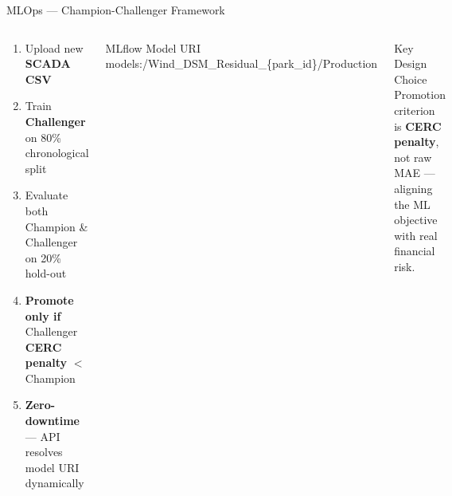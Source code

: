 \documentclass[aspectratio=169,10pt]{beamer}
\newcommand{\emphblue}[1]{{\color{WindBlue}\textbf{#1}}}
\newcommand{\emphgreen}[1]{{\color{MLgreen}\textbf{#1}}}
\newcommand{\emphred}[1]{{\color{DSMred}\textbf{#1}}}
\begin{document}
\begin{frame}{MLOps — Champion-Challenger Framework}
  \begin{columns}[T]
      \begin{tcolorbox}[orangebox, title={\faExchangeAlt\; Promotion Logic}]
        \begin{enumerate}[leftmargin=1.2em, itemsep=5pt, font=\small]
          \item Upload new \emphblue{SCADA CSV}
          \item Train \emphgreen{Challenger} on 80\% chronological split
          \item Evaluate both Champion \& Challenger on 20\% hold-out
          \item \textbf{Promote only if} Challenger \emphred{CERC penalty} $<$ Champion
          \item \emphgreen{Zero-downtime} — API resolves model URI dynamically
        \end{enumerate}
      \end{tcolorbox}

      \vspace{6pt}
      \begin{block}{MLflow Model URI}
        \small\ttfamily models:/Wind\_DSM\_Residual\_\{park\_id\}/Production
      \end{block}

      \vspace{4pt}
      \begin{alertblock}{Key Design Choice}
        Promotion criterion is \emphred{CERC penalty}, not raw MAE — aligning the ML objective with real financial risk.
      \end{alertblock}


\end{columns}
\end{frame}
\end{document}
